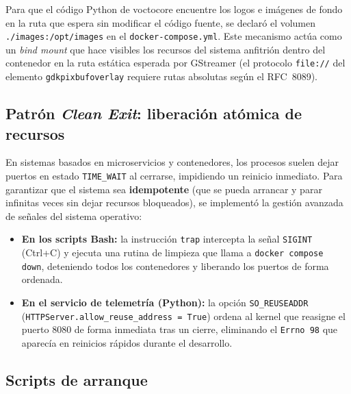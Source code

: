 Para que el código Python de voctocore encuentre los logos e imágenes de fondo en
la ruta que espera sin modificar el código fuente, se declaró el volumen
\texttt{./images:/opt/images} en el \texttt{docker-compose.yml}. Este mecanismo
actúa como un \textit{bind mount} que hace visibles los recursos del sistema
anfitrión dentro del contenedor en la ruta estática esperada por GStreamer
(el protocolo \texttt{file://} del elemento \texttt{gdkpixbufoverlay} requiere
rutas absolutas según el RFC~8089).


\subsection{Patrón \textit{Clean Exit}: liberación atómica de recursos}
\label{sec:clean_exit}

En sistemas basados en microservicios y contenedores, los procesos suelen dejar
puertos en estado \texttt{TIME\_WAIT} al cerrarse, impidiendo un reinicio inmediato.
Para garantizar que el sistema sea \textbf{idempotente} (que se pueda arrancar y
parar infinitas veces sin dejar recursos bloqueados), se implementó la gestión
avanzada de señales del sistema operativo:

\begin{itemize}
  \item \textbf{En los scripts Bash:} la instrucción \texttt{trap} intercepta la señal
        \texttt{SIGINT} (Ctrl+C) y ejecuta una rutina de limpieza que llama a
        \texttt{docker compose down}, deteniendo todos los contenedores y liberando
        los puertos de forma ordenada.
  \item \textbf{En el servicio de telemetría (Python):} la opción \texttt{SO\_REUSEADDR}
        (\texttt{HTTPServer.allow\_reuse\_address = True}) ordena al kernel que
        reasigne el puerto 8080 de forma inmediata tras un cierre, eliminando el
        \texttt{Errno~98} que aparecía en reinicios rápidos durante el desarrollo.
\end{itemize}

\subsection{Scripts de arranque}
\label{sec:scripts_arranque}

